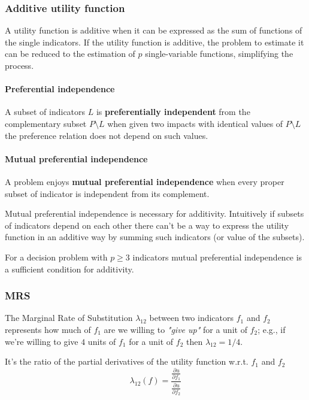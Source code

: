 \subsubsection{Additive utility function}

A utility function is additive when it can be expressed as the sum of functions of the single indicators. If the utility function is additive, the problem to estimate it can be reduced to the estimation of $p$ single-variable functions, simplifying the process.

\paragraph{Preferential independence} A subset of indicators $L$ is \textbf{preferentially independent} from the complementary subset $P \setminus L$ when given two impacts with identical values of $P \setminus L$ the preference relation does not depend on such values.

\paragraph{Mutual preferential independence} A problem enjoys \textbf{mutual preferential independence} when every proper subset of indicator is independent from its complement. 

Mutual preferential independence is necessary for additivity. Intuitively if subsets of indicators depend on each other there can't be a way to express the utility function in an additive way by summing such indicators (or value of the subsets).

For a decision problem with $p \geq 3$ indicators mutual preferential independence is a sufficient condition for additivity.

\subsubsection{MRS}

The Marginal Rate of Substitution $\lambda_{12}$ between two indicators $f_1$ and $f_2$ represents how much of $f_1$ are we willing to \textit{"give up"} for a unit of $f_2$; e.g., if we're willing to give $4$ units of $f_1$ for a unit of $f_2$ then $\lambda_{12} = 1/4$.

It's the ratio of the partial derivatives of the utility function w.r.t. $f_1$ and $f_2$
$$ \lambda_{12} (f) = \frac{ \frac{\partial u }{\partial f_1} }{ \frac{\partial u}{\partial f_2} } $$

